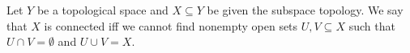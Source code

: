 \documentclass[12pt]{article}
\newcounter{123listctr}
\newcounter{123listcolonstylectr}
\begin{document}
Let $Y$ be a topological space and $X \subseteq Y$ be given the subspace topology. We say that $X$ is connected iff we cannot find nonempty open sets $U,V \subseteq X$ such that $U \cap V = \emptyset$ and $U \cup V = X$.
\end{document}
